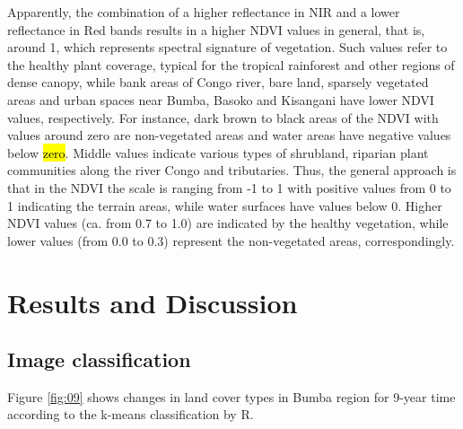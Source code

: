 \documentclass[applsci,article,submit,pdftex,moreauthors]{Definitions/mdpi}
\begin{document}
Apparently, the combination of a higher reflectance in NIR and a lower reflectance in Red bands results in a higher NDVI values in general, that is, around 1, which represents spectral signature of vegetation. Such values refer to the healthy plant coverage, typical for the tropical rainforest and other regions of dense canopy, while bank areas of Congo river, bare land, sparsely vegetated areas and urban spaces near Bumba, Basoko and Kisangani have lower NDVI values, respectively. For instance, dark brown to black areas of the NDVI with values around zero are non-vegetated areas and water areas have negative values below \hl{zero}. Middle values indicate various types of shrubland, riparian plant communities along the river Congo and tributaries. Thus, the general approach is that in the NDVI the scale is ranging from -1 to 1 with positive values from 0 to 1 indicating the terrain areas, while water surfaces have values below 0. Higher NDVI values (ca. from 0.7 to 1.0) are indicated by the healthy vegetation, while lower values (from 0.0 to 0.3) represent the non-vegetated areas, correspondingly. 

\section{Results and Discussion}

\subsection{Image classification}

Figure \ref{fig:09} shows changes in land cover types in Bumba region for 9-year time according to the k-means classification by R.
\end{document}
